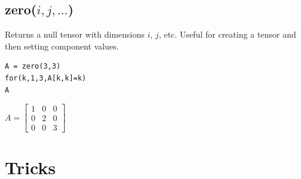 \documentclass[12pt]{article}
\begin{document}
\subsection*{zero($i,j,\ldots$)}

Returns a null tensor with dimensions $i$, $j$, etc.
Useful for creating a tensor and then setting component values.

{\color{blue}
\begin{verbatim}
A = zero(3,3)
for(k,1,3,A[k,k]=k)
A
\end{verbatim}
}

$\displaystyle
A=
\begin{bmatrix}
1 & 0 & 0
\\[1ex]
0 & 2 & 0
\\[1ex]
0 & 0 & 3
\end{bmatrix}
$

\newpage

\section{Tricks}
\end{document}
